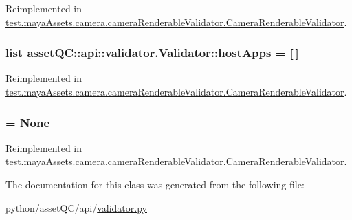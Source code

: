 \-Reimplemented in \hyperlink{classtest_1_1mayaAssets_1_1camera_1_1cameraRenderableValidator_1_1CameraRenderableValidator_ace1cfacae45b3e7dfc0df6dfe1f28500}{test.\-maya\-Assets.\-camera.\-camera\-Renderable\-Validator.\-Camera\-Renderable\-Validator}.

\hypertarget{classassetQC_1_1api_1_1validator_1_1Validator_a3a61440b99b6a8cf93bc45201ae6198c}{
\subsubsection[{host\-Apps}]{\setlength{\rightskip}{0pt plus 5cm}list {\bf asset\-Q\-C\-::api\-::validator.\-Validator\-::host\-Apps} = \mbox{[}$\,$\mbox{]}}}\label{d6/d00/classassetQC_1_1api_1_1validator_1_1Validator_a3a61440b99b6a8cf93bc45201ae6198c}


\-Reimplemented in \hyperlink{classtest_1_1mayaAssets_1_1camera_1_1cameraRenderableValidator_1_1CameraRenderableValidator_a7341592735355c7f6b25533620e1af3c}{test.\-maya\-Assets.\-camera.\-camera\-Renderable\-Validator.\-Camera\-Renderable\-Validator}.

\hypertarget{classassetQC_1_1api_1_1validator_1_1Validator_a18e82948dd828a6570885e9061857c9b}{
\subsubsection[{priority}]{ = \-None}}\label{d6/d00/classassetQC_1_1api_1_1validator_1_1Validator_a18e82948dd828a6570885e9061857c9b}


\-Reimplemented in \hyperlink{classtest_1_1mayaAssets_1_1camera_1_1cameraRenderableValidator_1_1CameraRenderableValidator_af0af9d27ff8eb889c6da8dc79b23e9ca}{test.\-maya\-Assets.\-camera.\-camera\-Renderable\-Validator.\-Camera\-Renderable\-Validator}.



\-The documentation for this class was generated from the following file\-:\begin{DoxyCompactItemize}
\item 
python/asset\-Q\-C/api/\hyperlink{validator_8py}{validator.\-py}\end{DoxyCompactItemize}
